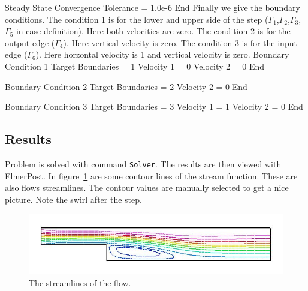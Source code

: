   Steady State Convergence Tolerance = 1.0e-6
End  
\ttend
Finally we give the boundary conditions.
The condition 1 is for the lower and upper side of the step 
($\Gamma_1$,$\Gamma_2$,$\Gamma_3$,$\Gamma_5$ in case definition).
Here both velocities are zero.
The condition 2 is for the output edge ($\Gamma_4$). Here vertical velocity is zero. 
The condition 3 is for the input edge ($\Gamma_6$). Here horzontal velocity is 1 and 
vertical velocity is zero.
\ttbegin
Boundary Condition 1
  Target Boundaries = 1
  Velocity 1 = 0
  Velocity 2 = 0
End

Boundary Condition 2
  Target Boundaries = 2
  Velocity 2 = 0
End

Boundary Condition 3
  Target Boundaries = 3
  Velocity 1 = 1
  Velocity 2 = 0
End
\ttend
\subsection*{Results}
Problem is solved with command {\tt Solver}. The results are then viewed with
ElmerPost. In figure~\ref{f:streamlines} are some contour lines of the stream
function. These are also flows streamlines. The contour values are manually
selected to get a nice picture. Note the swirl after the step.
\begin{figure}[!hb]
\begin{center}
\includegraphics[width=1.0\textwidth]{lines}
\end{center}
\caption{The streamlines of the flow.}
\label{f:streamlines}
\end{figure}








